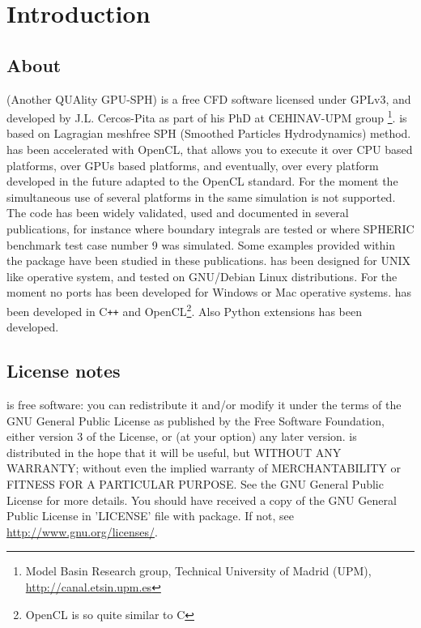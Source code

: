 \chapter{Introduction}
\label{s:introduction}
%
\section{About \NAME}
%
\NAME (Another QUAlity GPU-SPH) is a free CFD software licensed under GPLv3,
and developed by J.L. Cercos-Pita as part of his PhD at CEHINAV-UPM group
\footnote{Model Basin Research group, Technical University of Madrid (UPM),
\url{http://canal.etsin.upm.es}}. \NAME is based on Lagragian meshfree SPH
(Smoothed Particles Hydrodynamics) method.\rc
%
\NAME has been accelerated with OpenCL, that allows you to execute it over
CPU based platforms, over GPUs based platforms, and eventually, over every platform
developed in the future adapted to the OpenCL standard. For the moment the simultaneous
use of several platforms in the same simulation is not supported.\rc
%
The code has been widely validated, used and documented in several publications, for
instance \citet{Maciaetal_PTP_2012} where boundary integrals are tested or
\citet{perezrojas_cercos_stab12} where SPHERIC benchmark test case number 9 was simulated.
Some examples provided within the package have been studied in these publications.\rc
%
\NAME has been designed for UNIX like operative system, and tested on GNU/Debian Linux distributions.
%
For the moment no ports has been developed for Windows or Mac operative systems.
%
\NAME has been developed in C\texttt{++} and OpenCL\footnote{OpenCL is so quite similar to C}. Also Python extensions has been developed.
%
\section{License notes}
%
\NAME is free software: you can redistribute it and/or modify
it under the terms of the GNU General Public License as published by
the Free Software Foundation, either version 3 of the License, or
(at your option) any later version.\rc
%
\NAME is distributed in the hope that it will be useful,
but WITHOUT ANY WARRANTY; without even the implied warranty of
MERCHANTABILITY or FITNESS FOR A PARTICULAR PURPOSE.  See the
GNU General Public License for more details.\rc
%
You should have received a copy of the GNU General Public License
in 'LICENSE' file with \NAME package. If not, see
\url{http://www.gnu.org/licenses/}.
%
